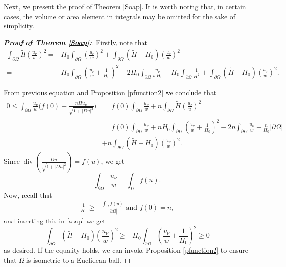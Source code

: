 \documentclass[12pt]{amsart}
\theoremstyle{plain}
\numberwithin{equation}{section}
\begin{document}
Next, we present the proof of Theorem \ref{Soap}. It is worth noting that, in certain cases, the volume or area element in integrals may be omitted for the sake of simplicity.

\begin{proof}[\textbf{Proof of Theorem \ref{Soap}:}]
    Firstly, note that
\begin{align*}
\int_{\partial\Omega}\widetilde{H}\left(\frac{u_\nu}{w}\right)^2=&H_{0}\int_{\partial\Omega}\left(\frac{u_\nu}{w}\right)^2+\int_{\partial\Omega}(\widetilde{H}-H_{0})\left(\frac{u_\nu}{w}\right)^2\\
 =&H_0\int_{\partial\Omega}\left(\frac{u_{\nu}}{w}+\frac{1}{H_0}\right)^2-2H_0\int_{\partial\Omega}\frac{u_{\nu}}{wH_0}-H_0\int_{\partial\Omega}\frac{1}{H_0^2}+\int_{\partial\Omega}(\widetilde{H}-H_{0})\left(\frac{u_\nu}{w}\right)^2.
\end{align*}

  From previous equation and Proposition \ref{pfunction2} we conclude that
\begin{align}
     0\leq\int_{\partial \Omega}\frac{u_{\nu}}{w}\bigg(f(0)+\frac{n\widetilde{H}u_\nu}{\sqrt{1+|D u|^2}}\bigg)&=f(0)\int_{\partial\Omega}\frac{u_{\nu}}{w}+n\int_{\partial\Omega}\widetilde{H}\left(\frac{u_\nu}{w}\right)^2\nonumber\\
     &=f(0)\int_{\partial\Omega}\frac{u_{\nu}}{w}+nH_0\int_{\partial\Omega}\left(\frac{u_{\nu}}{w}+\frac{1}{H_0}\right)^2-2n\int_{\partial\Omega}\frac{u_{\nu}}{w}-\frac{n}{H_0}|{\partial\Omega}|\nonumber\\
     &+n\int_{\partial\Omega}(\widetilde{H}-H_{0})\left(\frac{u_\nu}{w}\right)^2.\label{soap}  
\end{align}
Since $\displaystyle\operatorname{div}\left(\frac{D u}{\sqrt{1+|D u|^2}}\right)=f(u)$, we get 
$$\int_{\partial\Omega}\frac{u_\nu}{w}=\int_\Omega f(u).$$
Now, recall that
\begin{align*}
   \frac{1}{H_0}\geq -\frac{\displaystyle\int_{\Omega}f(u)}{|\partial\Omega|} \text{ and } f(0)=n,
\end{align*}
and inserting this in \eqref{soap} we get
    $$\int_{\partial\Omega}(\widetilde{H}-H_{0})\left(\frac{u_{\nu}}{w}\right)^2\geq -H_0\int_{\partial\Omega}\left(\frac{u_{\nu}}{w}+\frac{1}{H_0}\right)^2\geq 0$$
as desired. If the equality holds, we can invoke Proposition \ref{pfunction2} to ensure that $\Omega$ is isometric to a Euclidean ball.

\end{proof}
\end{document}
